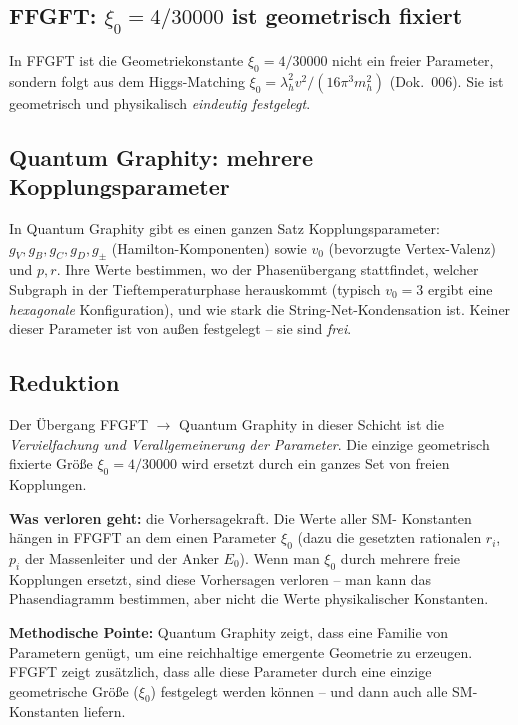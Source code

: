 \subsection{\texorpdfstring{FFGFT: $\xi_0 = 4/30000$ ist geometrisch fixiert}{FFGFT: xi0 = 4/30000 ist geometrisch fixiert}}

In FFGFT ist die Geometriekonstante $\xi_0 = 4/30000$ nicht ein
freier Parameter, sondern folgt aus dem Higgs-Matching
$\xi_0 = \lambda_h^2 v^2/(16\pi^3 m_h^2)$ (Dok.~006). Sie ist
geometrisch und physikalisch \emph{eindeutig festgelegt}.

\subsection{Quantum Graphity: mehrere Kopplungsparameter}

In Quantum Graphity gibt es einen ganzen Satz Kopplungsparameter:
$g_V, g_B, g_C, g_D, g_\pm$ (Hamilton-Komponenten) sowie $v_0$
(bevorzugte Vertex-Valenz) und $p, r$. Ihre Werte bestimmen, wo der
Phasenübergang stattfindet, welcher Subgraph in der Tieftemperaturphase
herauskommt (typisch $v_0 = 3$ ergibt eine \emph{hexagonale} Konfiguration),
und wie stark die String-Net-Kondensation ist. Keiner dieser
Parameter ist von außen festgelegt -- sie sind \emph{frei}.

\subsection{Reduktion}

Der Übergang FFGFT $\to$ Quantum Graphity in dieser Schicht ist die
\emph{Vervielfachung und Verallgemeinerung der Parameter}. Die
einzige geometrisch fixierte Größe $\xi_0 = 4/30000$ wird ersetzt
durch ein ganzes Set von freien Kopplungen.

\textbf{Was verloren geht:} die Vorhersagekraft. Die Werte aller SM-
Konstanten hängen in FFGFT an dem einen Parameter $\xi_0$
(dazu die gesetzten rationalen $r_i$, $p_i$ der Massenleiter und der
Anker $E_0$). Wenn man
$\xi_0$ durch mehrere freie Kopplungen ersetzt, sind diese
Vorhersagen verloren -- man kann das Phasendiagramm bestimmen, aber
nicht die Werte physikalischer Konstanten.

\textbf{Methodische Pointe:} Quantum Graphity zeigt, dass eine
Familie von Parametern genügt, um eine reichhaltige emergente
Geometrie zu erzeugen. FFGFT zeigt zusätzlich, dass alle diese
Parameter durch eine einzige geometrische Größe ($\xi_0$) festgelegt
werden können -- und dann auch alle SM-Konstanten liefern.

